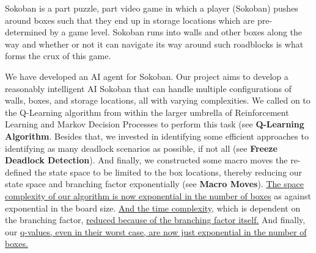 \documentclass{article}
\begin{document}
Sokoban is a part puzzle, part video game in which a player (Sokoban) pushes around boxes such that they end up in storage locations which are pre-determined by a game level. Sokoban runs into walls and other boxes along the way and whether or not it can navigate its way around such roadblocks is what forms the crux of this game. 

We have developed an AI agent for Sokoban. Our project aims to develop a reasonably intelligent AI Sokoban that can handle multiple configurations of walls, boxes, and storage locations, all with varying complexities. We called on to the Q-Learning algorithm from within the larger umbrella of Reinforcement Learning and Markov Decision Processes to perform this task (see \textbf{Q-Learning Algorithm}. Besides that, we invested in identifying some efficient approaches to identifying as many deadlock scenarios as possible, if not all (see \textbf{Freeze Deadlock Detection}). And finally, we constructed some macro moves the re-defined the state space to be limited to the box locations, thereby reducing our state space and branching factor exponentially (see \textbf{Macro Moves}). \underline{The space complexity of our algorithm is now exponential in the number of boxes} as against exponential in the board size. \underline{And the time complexity}, which is dependent on the branching factor, \underline{reduced because of the branching factor itself.} And finally, our \underline{q-values, even in their worst case, are now just exponential in the number of boxes.}





\end{document}
